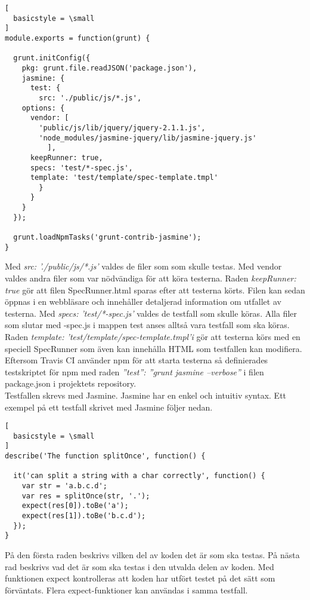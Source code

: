 \begin{lstlisting}[
  basicstyle = \small
]
module.exports = function(grunt) {

  grunt.initConfig({
    pkg: grunt.file.readJSON('package.json'),
    jasmine: {
      test: {
        src: './public/js/*.js',
	options: {
	  vendor: [
	    'public/js/lib/jquery/jquery-2.1.1.js',
	    'node_modules/jasmine-jquery/lib/jasmine-jquery.js'
          ],
	  keepRunner: true,
	  specs: 'test/*-spec.js',
	  template: 'test/template/spec-template.tmpl'
        }
      }
    }
  });

  grunt.loadNpmTasks('grunt-contrib-jasmine');
}
\end{lstlisting}

Med \emph{src: './public/js/*.js'} valdes de filer som som skulle testas.
Med vendor valdes andra filer som var nödvändiga för att köra testerna.
Raden \emph{keepRunner: true} gör att filen \textunderscore SpecRunner.html sparas efter att
testerna körts. Filen kan sedan öppnas i en webbläsare och innehåller
detaljerad information om utfallet av testerna.
Med \emph{specs: 'test/*-spec.js'} valdes de testfall som skulle köras.
Alla filer som slutar med -spec.js i mappen test anses alltså vara
testfall som ska köras.
Raden \emph{template: 'test/template/spec-template.tmpl'i} gör att testerna
körs med en speciell SpecRunner som även kan innehålla HTML som testfallen
kan modifiera.
Eftersom Travis CI använder npm för att starta 
testerna så definierades testskriptet för npm med raden
\emph{''test'': ''grunt jasmine --verbose''} i filen package.json 
i projektets repository.\\

Testfallen skrevs med Jasmine. Jasmine har en enkel och intuitiv syntax.
Ett exempel på ett testfall skrivet med Jasmine följer nedan.

\begin{lstlisting}[
  basicstyle = \small
]
describe('The function splitOnce', function() {
	
  it('can split a string with a char correctly', function() {
    var str = 'a.b.c.d';
    var res = splitOnce(str, '.');
    expect(res[0]).toBe('a');
    expect(res[1]).toBe('b.c.d');
  });
}
\end{lstlisting}

På den första raden beskrivs vilken del av koden det är som ska testas.
På nästa rad beskrivs vad det är som ska testas i den utvalda delen av koden.
Med funktionen expect kontrolleras att koden har utfört testet på det sätt
som förväntats. Flera expect-funktioner kan användas i samma testfall.\\

